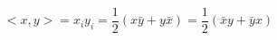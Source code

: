 \begin{equation}
<x,y>=x_i y_i=\frac{1}{2}(x\bar{y} + y \bar{x})=\frac{1}{2}(\bar{x} y + \bar{y} x)
\end{equation}

